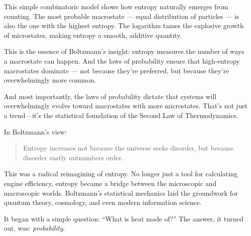 This simple combinatoric model shows how entropy naturally emerges from counting. The most probable macrostate — equal distribution of particles — is also the one with the highest entropy. The logarithm tames the explosive growth of microstates, making entropy a smooth, additive quantity.

This is the essence of Boltzmann’s insight: entropy measures the number of ways a macrostate can happen. And the laws of probability ensure that high-entropy macrostates dominate — not because they’re preferred, but because they’re overwhelmingly more common.




And most importantly, the laws of probability dictate that systems will overwhelmingly evolve toward macrostates with more microstates. That’s not just a trend—it’s the statistical foundation of the Second Law of Thermodynamics.

In Boltzmann’s view:
\begin{quote}
Entropy increases not because the universe seeks disorder, but because disorder vastly outnumbers order.
\end{quote}

This was a radical reimagining of entropy. No longer just a tool for calculating engine efficiency, entropy became a bridge between the microscopic and macroscopic worlds. Boltzmann’s statistical mechanics laid the groundwork for quantum theory, cosmology, and even modern information science.

It began with a simple question: “What is heat made of?”  
The answer, it turned out, was: \emph{probability}.



